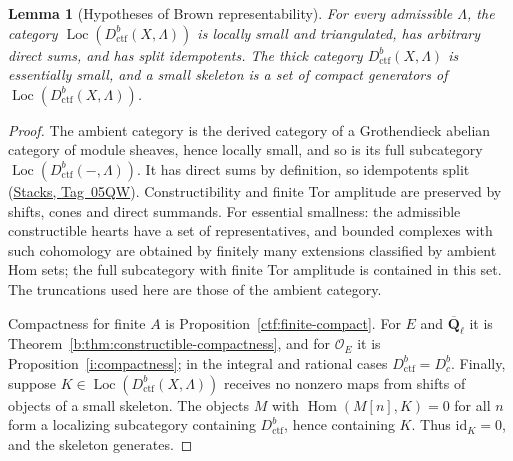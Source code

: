 \documentclass[11pt,a4paper]{article}
\numberwithin{equation}{section}
\newtheorem{lemma}[theorem]{Lemma}
\theoremstyle{definition}
\theoremstyle{remark}
\newcommand{\Dbc}{D^b_c}
\newcommand{\Loc}{\operatorname{Loc}}
\newcommand{\Qbar}{\overline{\mathbf Q}_\ell}
\newcommand{\stacks}[1]{\href{https://stacks.math.columbia.edu/tag/#1}{\textnormal{Stacks, Tag~#1}}}
\newcommand{\Hom}{\operatorname{Hom}}
\newcommand{\Dctf}{D^b_{\mathrm{ctf}}}
\begin{document}
\begin{lemma}[Hypotheses of Brown representability]
\label{b:lem:brown-hypotheses}\label{ctf:unified-compact}
For every admissible $\Lambda$, the category $\Loc(\Dctf(X,\Lambda))$
is locally small and triangulated, has arbitrary direct sums, and
has split idempotents. The thick category $\Dctf(X,\Lambda)$ is
essentially small, and a small skeleton is a set of compact generators
of $\Loc(\Dctf(X,\Lambda))$.
\end{lemma}
\begin{proof}
The ambient category is the derived category of a Grothendieck
abelian category of module sheaves, hence locally small, and so is its
full subcategory $\Loc(\Dctf(-,\Lambda))$. It has direct sums by
definition, so idempotents split (\stacks{05QW}). Constructibility and
finite Tor amplitude are preserved by shifts, cones and direct
summands. For essential smallness: the admissible constructible hearts
have a set of representatives, and bounded complexes with such
cohomology are obtained by finitely many extensions classified by
ambient Hom sets; the full subcategory with finite Tor amplitude is
contained in this set. The truncations used here are those of the
ambient category.

Compactness for finite $A$ is Proposition~\ref{ctf:finite-compact}.
For $E$ and $\Qbar$ it is
Theorem~\ref{b:thm:constructible-compactness}, and for $\mathcal O_E$
it is Proposition~\ref{i:compactness}; in the integral and rational cases
$\Dctf=\Dbc$. Finally, suppose $K\in\Loc(\Dctf(X,\Lambda))$ receives no
nonzero maps from shifts of objects of a small skeleton. The objects
$M$ with $\Hom(M[n],K)=0$ for all $n$ form a localizing subcategory
containing $\Dctf$, hence containing $K$. Thus $\mathrm{id}_K=0$, and
the skeleton generates.
\end{proof}
\end{document}
